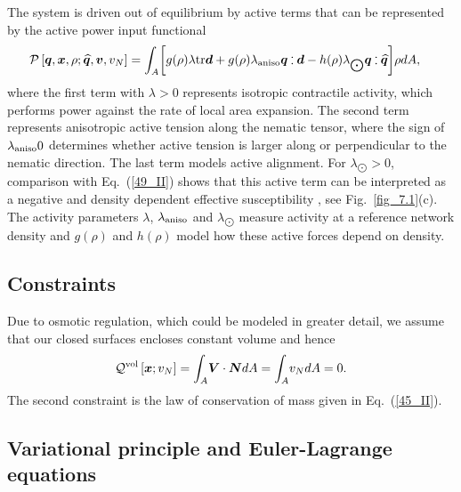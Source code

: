 The system is driven out of equilibrium by active terms that can be represented by the active power input functional 
\begin{align}  \label{60_II}
	\mathcal{P} \left[\bm{q}, \bm{x},\rho;  \widehat{\bm{q}}, \bm{v},v_N \right]  &= {\int_A} \bigg[ g(\rho)\lambda \text{tr}\bm{d} +  g(\rho)\lambda_{\rm aniso}  \bm{q}\cddot \bm{d} -   h(\rho)\lambda_{\bigodot}  \bm{q} \cddot \widehat{\bm{q}}  \bigg] \rho  d A ,
\end{align}
where the  first  term  with $\lambda >0$ represents  isotropic contractile activity, which performs power against  the rate of local area expansion. The second term represents anisotropic active tension along the nematic tensor, where the sign of $\lambda_{\rm aniso}0$ determines whether active tension is larger along or perpendicular to the nematic direction. The last term models active alignment. For $\lambda_{\bigodot}>0$, comparison with Eq.~(\ref{49_II}) shows that this active term can be interpreted as a negative and density dependent effective susceptibility \cite{miller2012}, see Fig.~\ref{fig_7.1}(c). The activity parameters $\lambda$, $\lambda_{\rm aniso}$ and $\lambda_{\bigodot}$  measure  activity at a reference network density and $g(\rho)$ and $h(\rho)$ model how these active forces depend on density. 

\subsection{Constraints}

Due to osmotic regulation, which could be modeled in greater detail, we assume that our closed surfaces encloses constant volume and hence
\begin{equation} \label{61_II}
	\mathcal{Q}^{\rm vol}\left[\bm{x};v_N\right] = {\int_A}  \bm{V} \cdot \bm{N} d A = {\int_A}  v_N d A = 0.
\end{equation}
The second constraint is the law of conservation of mass given in Eq.~(\ref{45_II}).


\subsection{Variational principle and Euler-Lagrange equations}


